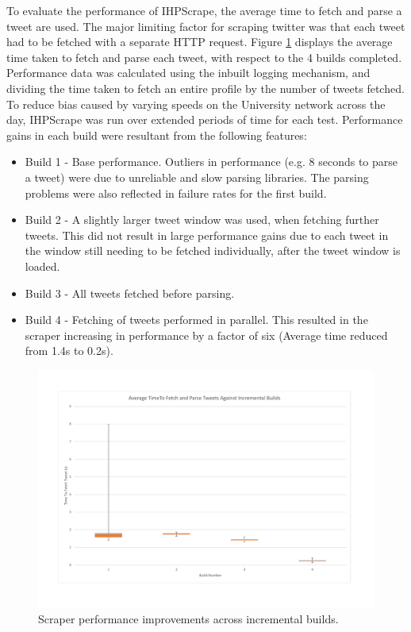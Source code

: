 To evaluate the performance of IHPScrape, the average time to fetch and parse a tweet are used. The major limiting factor for scraping twitter was that each tweet had to be fetched with a separate HTTP request. Figure \ref{fig:scrape_perf} displays the average time taken to fetch and parse each tweet, with respect to the 4 builds completed. Performance data was calculated using the inbuilt logging mechanism, and dividing the time taken to fetch an entire profile by the number of tweets fetched. To reduce bias caused by varying speeds on the University network across the day, IHPScrape was run over extended periods of time for each test. Performance gains in each build were resultant from the following features:

\begin{itemize}
 \item Build 1 - Base performance. Outliers in performance (e.g. 8 seconds to parse a tweet) were due to unreliable and slow parsing libraries. The parsing problems were also reflected in failure rates for the first build.
 \item Build 2 - A slightly larger tweet window was used, when fetching further tweets. This did not result in large performance gains due to each tweet in the window still needing to be fetched individually, after the tweet window is loaded. 
 \item Build 3 - All tweets fetched before parsing. 
 \item Build 4 - Fetching of tweets performed in parallel. This resulted in the scraper increasing in performance by a factor of six (Average time reduced from 1.4s to 0.2s).
\end{itemize}

\begin{center}
\begin{figure}[h!]
\centering
\includegraphics[width=500px]{Images/scrape_performance_against_builds.pdf}
\caption{Scraper performance improvements across incremental builds.}
\label{fig:scrape_perf}
\end{figure}
\end{center}

